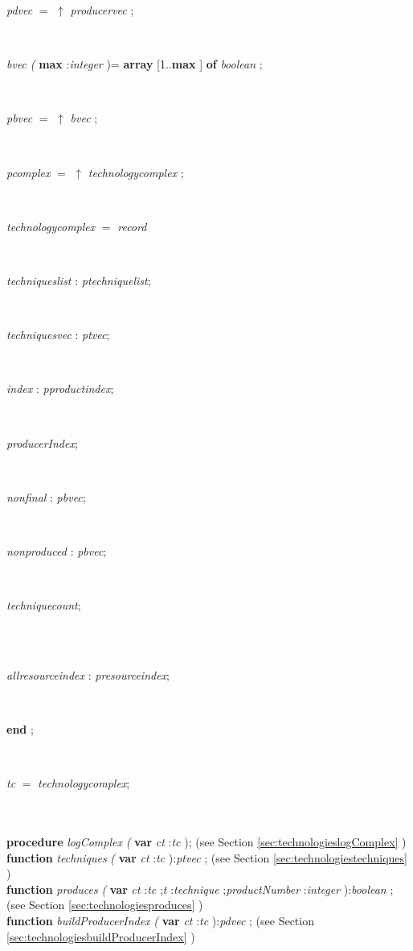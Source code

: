 \begin{tabbing}
\parbox{14cm}{\textsf{\textit{pdvec} $=$ $\uparrow$ \textit{producervec} }; }\\
\parbox{14cm}{\textsf{\textit{bvec} \textit{(} \textbf{max} :\textit{integer} )= \textbf{array} [1..\textbf{max} ] \textbf{of}  \textit{boolean} ;}}\\
\parbox{14cm}{\textsf{\textit{pbvec} $=$ $\uparrow$ \textit{bvec} }; }\\
\parbox{14cm}{\textsf{\textit{pcomplex} $=$ $\uparrow$ \textit{technologycomplex} }; }\\
\+\parbox{14cm}{\textsf{\textit{technologycomplex} $=$ \textit{record}}}\\
\parbox{14cm}{\textsf{\textit{techniqueslist} : \textit{ptechniquelist}}; }\\
\parbox{14cm}{\textsf{\textit{techniquesvec} : \textit{ptvec}}; }\\
\parbox{14cm}{\textsf{\textit{index} : \textit{pproductindex}}; }\\
\parbox{14cm}{\textsf{\textit{producerIndex}}; }\\
\parbox{14cm}{\textsf{\textit{nonfinal} : \textit{pbvec}}; }\\
\parbox{14cm}{\textsf{\textit{nonproduced} : \textit{pbvec}}; }\\
\parbox{14cm}{\textsf{\textit{techniquecount}}; }\\
\\
\parbox{14cm}{\textsf{\textit{allresourceindex} : \textit{presourceindex}}; }\\
\<\-\parbox{14cm}{\textsf{\textbf{end} ;}}\\
\parbox{14cm}{\textsf{\textit{tc} $=$ \textit{technologycomplex}}; }\\
\\
\<\textsf{\textbf{procedure}  \textit{logComplex} \textit{(} \textbf{var}  \textit{ct} :\textit{tc} );} (see Section \ref{sec:technologieslogComplex} )\\
\<\textsf{\textbf{function}  \textit{techniques} \textit{(} \textbf{var}  \textit{ct} :\textit{tc} ):\textit{ptvec} ;} (see Section \ref{sec:technologiestechniques} )\\
\<\textsf{\textbf{function}  \textit{produces} \textit{(} \textbf{var}  \textit{ct} :\textit{tc} ;\textit{t}  :\textit{technique} ;\textit{productNumber} :\textit{integer} ):\textit{boolean} ;} (see Section \ref{sec:technologiesproduces} )\\
\<\textsf{\textbf{function}  \textit{buildProducerIndex} \textit{(} \textbf{var}  \textit{ct} :\textit{tc} ):\textit{pdvec}  ;} (see Section \ref{sec:technologiesbuildProducerIndex} )\\

\end{tabbing}
